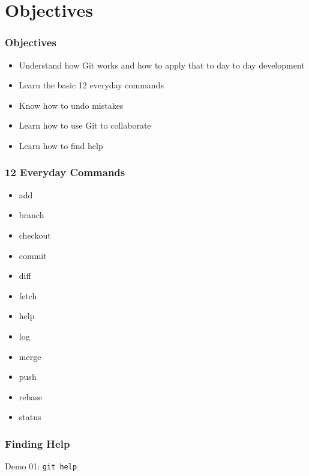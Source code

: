 \section[Section]{Objectives}

\begin{frame}
\frametitle{Objectives}
\begin{itemize}
    \item Understand how Git works and how to apply that to day to day
          development
    \item Learn the basic 12 everyday commands
    \item Know how to undo mistakes
    \item Learn how to use Git to collaborate
    \item Learn how to find help
\end{itemize}
\end{frame}

\begin{frame}
\frametitle{12 Everyday Commands}
\begin{multicols}{3}
    \begin{itemize}
        \setlength\itemsep{3em}
        \item add
        \item branch
        \item checkout
        \item commit
        \item diff
        \item fetch
        \item help
        \item log
        \item merge
        \item push
        \item rebase
        \item status
    \end{itemize}
\end{multicols}
\end{frame}

\begin{frame}
\frametitle{Finding Help}
\alert{Demo 01}: \texttt{git help}
\end{frame}

